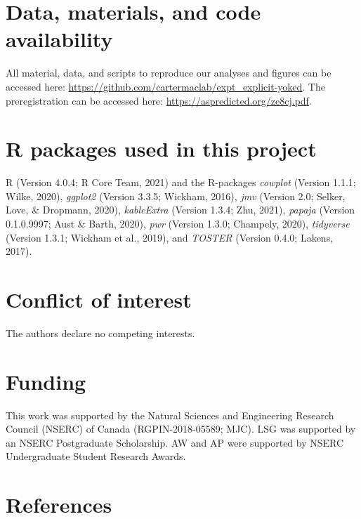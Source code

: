 \documentclass[
  english,
  doc, donotrepeattitle,floatsintext]{apa7}
\begin{document}
\hypertarget{data-materials-and-code-availability}{%
\section{Data, materials, and code availability}\label{data-materials-and-code-availability}}

\label{sec:sharing}
All material, data, and scripts to reproduce our analyses and figures can be accessed here: \url{https://github.com/cartermaclab/expt_explicit-yoked}. The preregistration can be accessed here: \url{https://aspredicted.org/ze8cj.pdf}.

\hypertarget{r-packages-used-in-this-project}{%
\section{R packages used in this project}\label{r-packages-used-in-this-project}}

R (Version 4.0.4; R Core Team, 2021) and the R-packages \emph{cowplot} (Version 1.1.1; Wilke, 2020), \emph{ggplot2} (Version 3.3.5; Wickham, 2016), \emph{jmv} (Version 2.0; Selker, Love, \& Dropmann, 2020), \emph{kableExtra} (Version 1.3.4; Zhu, 2021), \emph{papaja} (Version 0.1.0.9997; Aust \& Barth, 2020), \emph{pwr} (Version 1.3.0; Champely, 2020), \emph{tidyverse} (Version 1.3.1; Wickham et al., 2019), and \emph{TOSTER} (Version 0.4.0; Lakens, 2017).

\hypertarget{conflict-of-interest}{%
\section{Conflict of interest}\label{conflict-of-interest}}

The authors declare no competing interests.

\hypertarget{funding}{%
\section{Funding}\label{funding}}

This work was supported by the Natural Sciences and Engineering Research Council (NSERC) of Canada (RGPIN-2018-05589; MJC). LSG was supported by an NSERC Postgraduate Scholarship. AW and AP were supported by NSERC Undergraduate Student Research Awards.

\newpage

\hypertarget{references}{%
\section{References}\label{references}}
\end{document}
